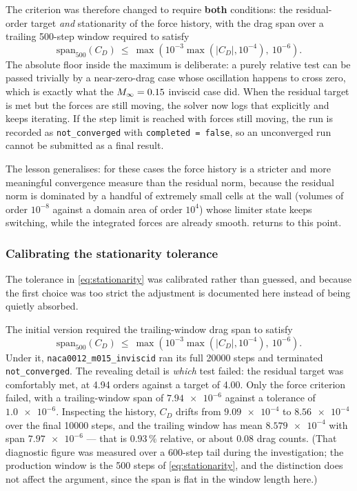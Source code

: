The criterion was therefore changed to require \textbf{both} conditions: the
residual-order target \emph{and} stationarity of the force history, with the drag
span over a trailing 500-step window required to satisfy
\begin{equation}
  \mathrm{span}_{500}(C_D)\ \le\
  \max\left(10^{-3}\max\left(|C_D|,10^{-4}\right),\ 10^{-6}\right).
  \label{eq:stationarity}
\end{equation}
The absolute floor inside the maximum is deliberate: a purely relative test can be
passed trivially by a near-zero-drag case whose oscillation happens to cross zero,
which is exactly what the $M_\infty=0.15$ inviscid case did. When the residual target
is met but the forces are still moving, the solver now logs that explicitly and
keeps iterating. If the step limit is reached with forces still moving, the run is
recorded as \texttt{not\_converged} with \texttt{completed = false}, so an
unconverged run cannot be submitted as a final result.

The lesson generalises: for these cases the force history is a stricter and more
meaningful convergence measure than the residual norm, because the residual norm
is dominated by a handful of extremely small cells at the wall (volumes of order
$10^{-8}$ against a domain area of order $10^4$) whose limiter state keeps
switching, while the integrated forces are already smooth.
 returns to this point.

\subsubsection{Calibrating the stationarity tolerance}
\label{sec:tolerance}

The tolerance in \cref{eq:stationarity} was calibrated rather than guessed, and
because the first choice was too strict the adjustment is documented here instead
of being quietly absorbed.

The initial version required the trailing-window drag span to satisfy
\begin{equation*}
  \mathrm{span}_{500}(C_D)\ \le\
  \max\!\left(10^{-3}\max\left(|C_D|,10^{-4}\right),\ 10^{-6}\right).
\end{equation*}
Under it,
\texttt{naca0012\_m015\_inviscid} ran its full \num{20000} steps and terminated
\texttt{not\_converged}. The revealing detail is \emph{which} test failed: the
residual target was comfortably met, at 4.94 orders against a target of 4.00. Only
the force criterion failed, with a trailing-window span of $\num{7.94e-6}$ against
a tolerance of $\num{1.0e-6}$. Inspecting the history, $C_D$ drifts from
$\num{9.09e-4}$ to $\num{8.56e-4}$ over the final \num{10000} steps, and the
trailing window has mean $\num{8.579e-4}$ with span $\num{7.97e-6}$ --- that is
$0.93\,\%$ relative, or about $0.08$ drag counts. (That diagnostic figure was
measured over a 600-step tail during the investigation; the production window is
the 500 steps of \cref{eq:stationarity}, and the distinction does not affect the
argument, since the span is flat in the window length here.)

